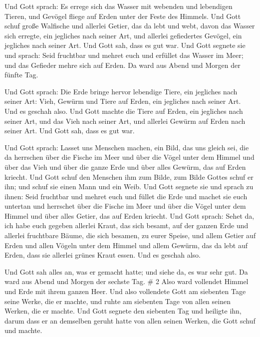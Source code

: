  Und Gott sprach: Es errege sich das Wasser mit webenden
und lebendigen Tieren, und Gevögel fliege auf Erden unter der Feste des
Himmels.  Und Gott schuf große Walfische und allerlei
Getier, das da lebt und webt, davon das Wasser sich erregte, ein
jegliches nach seiner Art, und allerlei gefiedertes Gevögel, ein
jegliches nach seiner Art. Und Gott sah, dass es gut war. 
Und Gott segnete sie und sprach: Seid fruchtbar und mehret euch und
erfüllet das Wasser im Meer; und das Gefieder mehre sich auf Erden.
 Da ward aus Abend und Morgen der fünfte Tag.

 Und Gott sprach: Die Erde bringe hervor lebendige Tiere,
ein jegliches nach seiner Art: Vieh, Gewürm und Tiere auf Erden, ein
jegliches nach seiner Art. Und es geschah also.  Und Gott
machte die Tiere auf Erden, ein jegliches nach seiner Art, und das Vieh
nach seiner Art, und allerlei Gewürm auf Erden nach seiner Art. Und Gott
sah, dass es gut war.

 Und Gott sprach: Lasset uns Menschen machen, ein Bild, das
uns gleich sei, die da herrschen über die Fische im Meer und über die
Vögel unter dem Himmel und über das Vieh und über die ganze Erde und
über alles Gewürm, das auf Erden kriecht.  Und Gott schuf
den Menschen ihm zum Bilde, zum Bilde Gottes schuf er ihn; und schuf sie
einen Mann und ein Weib.  Und Gott segnete sie und sprach
zu ihnen: Seid fruchtbar und mehret euch und füllet die Erde und machet
sie euch untertan und herrschet über die Fische im Meer und über die
Vögel unter dem Himmel und über alles Getier, das auf Erden kriecht.
 Und Gott sprach: Sehet da, ich habe euch gegeben allerlei
Kraut, das sich besamt, auf der ganzen Erde und allerlei fruchtbare
Bäume, die sich besamen, zu eurer Speise,  und allem Getier
auf Erden und allen Vögeln unter dem Himmel und allem Gewürm, das da
lebt auf Erden, dass sie allerlei grünes Kraut essen. Und es geschah
also.

 Und Gott sah alles an, was er gemacht hatte; und siehe da,
es war sehr gut. Da ward aus Abend und Morgen der sechste Tag. \# 2
 Also ward vollendet Himmel und Erde mit ihrem ganzen Heer.
 Und also vollendete Gott am siebenten Tage seine Werke, die
er machte, und ruhte am siebenten Tage von allen seinen Werken, die er
machte.  Und Gott segnete den siebenten Tag und heiligte
ihn, darum dass er an demselben geruht hatte von allen seinen Werken,
die Gott schuf und machte.

